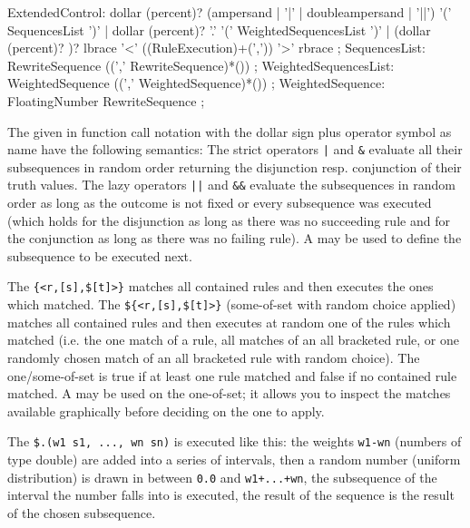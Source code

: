 \begin{rail} 
  ExtendedControl: 
	dollar (percent)? (ampersand | '|' | doubleampersand | '||') '(' SequencesList ')' |
	dollar (percent)? '.' '(' WeightedSequencesList ')' |
	(dollar (percent)? )? lbrace '<' ((RuleExecution)+(',')) '>' rbrace
	;
  SequencesList:
	RewriteSequence ((',' RewriteSequence)*())
	;
  WeightedSequencesList:
	WeightedSequence ((',' WeightedSequence)*())
	;
  WeightedSequence:
	FloatingNumber RewriteSequence
	;
\end{rail}

The  given in function call notation with the dollar sign plus operator symbol as name have the following semantics:
The strict operators \verb/|/ and \verb/&/ evaluate all their subsequences in random order returning the disjunction resp. conjunction of their truth values.
The lazy operators \verb/||/ and \verb/&&/ evaluate the subsequences in random order as long as the outcome is not fixed or every subsequence was executed 
(which holds for the disjunction as long as there was no succeeding rule and for the conjunction as long as there was no failing rule).
A  may be used to define the subsequence to be executed next.

The  \verb/{<r,[s],$[t]>}/ matches all contained rules and then executes the ones which matched.
The  \verb/${<r,[s],$[t]>}/ (some-of-set with random choice applied) matches all contained rules and then executes at random one of the rules which matched
(i.e. the one match of a rule, all matches of an all bracketed rule, or one randomly chosen match of an all bracketed rule with random choice).
The one/some-of-set is true if at least one rule matched and false if no contained rule matched.
A  may be used on the one-of-set; it allows you to inspect the matches available graphically before deciding on the one to apply. 

The  \verb/$.(w1 s1, ..., wn sn)/ is executed like this:
the weights \texttt{w1-wn} (numbers of type double) are added into a series of intervals,
then a random number (uniform distribution) is drawn in between \texttt{0.0} and \texttt{w1+...+wn},
the subsequence of the interval the number falls into is executed,
the result of the sequence is the result of the chosen subsequence.



